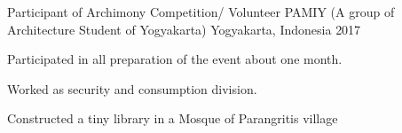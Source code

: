 \begin{cventries}
{\begin{cvitems}
		\end{cvitems}
	}
	\cventry
	{Participant of Archimony Competition/ Volunteer} %
	{PAMIY (A group of Architecture Student of Yogyakarta)} %
	{Yogyakarta, Indonesia} %
	{2017} %
	{
		\begin{cvitems} %
			\item{Participated in all preparation of the event about one month.}
			\item {Worked as security and consumption division.}
			\item {Constructed a tiny library in a Mosque of Parangritis village }
		\end{cvitems}
	}

\end{cventries}
